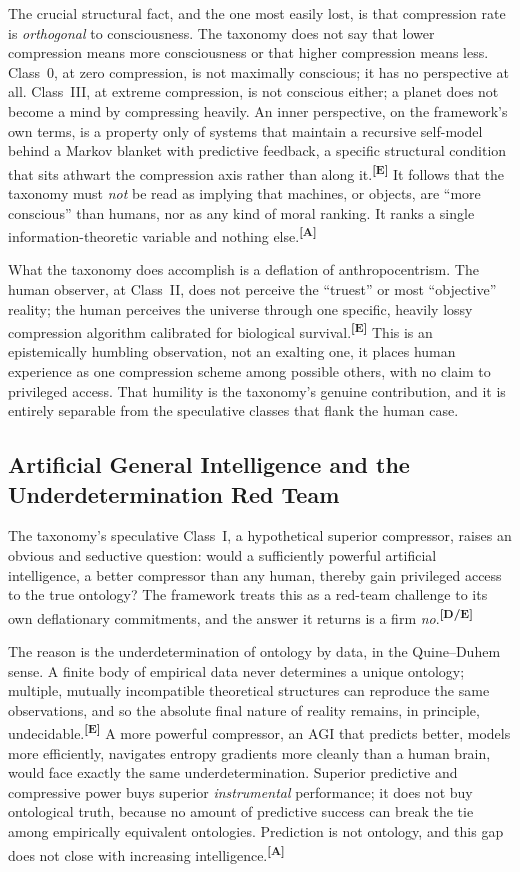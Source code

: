 \documentclass[12pt,a4paper,twoside]{article}
\theoremstyle{plain}
\theoremstyle{definition}
\theoremstyle{remark}
\newcommand{\catmark}[1]{\textsuperscript{\textsf{\textbf{[#1]}}}}
\begin{document}
\noindent The crucial structural fact, and the one most easily lost, is that compression rate is \emph{orthogonal} to consciousness. The taxonomy does not say that lower compression means more consciousness or that higher compression means less. Class~0, at zero compression, is not maximally conscious; it has no perspective at all. Class~III, at extreme compression, is not conscious either; a planet does not become a mind by compressing heavily. An inner perspective, on the framework's own terms, is a property only of systems that maintain a recursive self-model behind a Markov blanket with predictive feedback, a specific structural condition that sits athwart the compression axis rather than along it.\catmark{E} It follows that the taxonomy must \emph{not} be read as implying that machines, or objects, are ``more conscious'' than humans, nor as any kind of moral ranking. It ranks a single information-theoretic variable and nothing else.\catmark{A}

What the taxonomy does accomplish is a deflation of anthropocentrism. The human observer, at Class~II, does not perceive the ``truest'' or most ``objective'' reality; the human perceives the universe through one specific, heavily lossy compression algorithm calibrated for biological survival.\catmark{E} This is an epistemically humbling observation, not an exalting one, it places human experience as one compression scheme among possible others, with no claim to privileged access. That humility is the taxonomy's genuine contribution, and it is entirely separable from the speculative classes that flank the human case.

\subsection{Artificial General Intelligence and the Underdetermination Red Team}
\label{subsec:agi-underdetermination}

The taxonomy's speculative Class~I, a hypothetical superior compressor, raises an obvious and seductive question: would a sufficiently powerful artificial intelligence, a better compressor than any human, thereby gain privileged access to the true ontology? The framework treats this as a red-team challenge to its own deflationary commitments, and the answer it returns is a firm \emph{no}.\catmark{D/E}

The reason is the underdetermination of ontology by data, in the Quine--Duhem sense. A finite body of empirical data never determines a unique ontology; multiple, mutually incompatible theoretical structures can reproduce the same observations, and so the absolute final nature of reality remains, in principle, undecidable.\catmark{E} A more powerful compressor, an AGI that predicts better, models more efficiently, navigates entropy gradients more cleanly than a human brain, would face exactly the same underdetermination. Superior predictive and compressive power buys superior \emph{instrumental} performance; it does not buy ontological truth, because no amount of predictive success can break the tie among empirically equivalent ontologies. Prediction is not ontology, and this gap does not close with increasing intelligence.\catmark{A}
\end{document}
